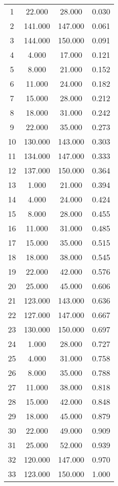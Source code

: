 % 
\begin{tabular}{cccc}
  \hline
  \hline
1 & 22.000 & 28.000 & 0.030 \\ 
  2 & 141.000 & 147.000 & 0.061 \\ 
  3 & 144.000 & 150.000 & 0.091 \\ 
  4 & 4.000 & 17.000 & 0.121 \\ 
  5 & 8.000 & 21.000 & 0.152 \\ 
  6 & 11.000 & 24.000 & 0.182 \\ 
  7 & 15.000 & 28.000 & 0.212 \\ 
  8 & 18.000 & 31.000 & 0.242 \\ 
  9 & 22.000 & 35.000 & 0.273 \\ 
  10 & 130.000 & 143.000 & 0.303 \\ 
  11 & 134.000 & 147.000 & 0.333 \\ 
  12 & 137.000 & 150.000 & 0.364 \\ 
  13 & 1.000 & 21.000 & 0.394 \\ 
  14 & 4.000 & 24.000 & 0.424 \\ 
  15 & 8.000 & 28.000 & 0.455 \\ 
  16 & 11.000 & 31.000 & 0.485 \\ 
  17 & 15.000 & 35.000 & 0.515 \\ 
  18 & 18.000 & 38.000 & 0.545 \\ 
  19 & 22.000 & 42.000 & 0.576 \\ 
  20 & 25.000 & 45.000 & 0.606 \\ 
  21 & 123.000 & 143.000 & 0.636 \\ 
  22 & 127.000 & 147.000 & 0.667 \\ 
  23 & 130.000 & 150.000 & 0.697 \\ 
  24 & 1.000 & 28.000 & 0.727 \\ 
  25 & 4.000 & 31.000 & 0.758 \\ 
  26 & 8.000 & 35.000 & 0.788 \\ 
  27 & 11.000 & 38.000 & 0.818 \\ 
  28 & 15.000 & 42.000 & 0.848 \\ 
  29 & 18.000 & 45.000 & 0.879 \\ 
  30 & 22.000 & 49.000 & 0.909 \\ 
  31 & 25.000 & 52.000 & 0.939 \\ 
  32 & 120.000 & 147.000 & 0.970 \\ 
  33 & 123.000 & 150.000 & 1.000 \\ 
   \hline
\end{tabular}
